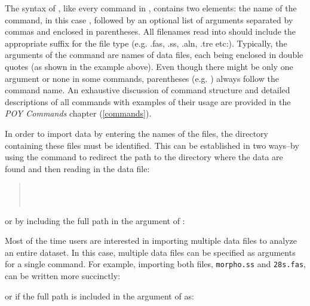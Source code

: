 {The syntax of , like every command in \poy,
contains two elements: the name of the command, in this case
, followed by an optional list of arguments
separated by commas and enclosed in parentheses. All filenames read
into \poy should include the appropriate suffix for the file type
(e.g. .fas, .ss, .aln, .tre etc:).  Typically, the arguments of the
command  are names of data files, each being
enclosed in double quotes (as shown in the example above). Even
though there might be only one argument or none in some commands,
parentheses (e.g. ) always follow the command
name. An exhaustive discussion of \poy command structure and detailed
descriptions of all commands with examples of their usage are
provided in the \emph{POY Commands} chapter (\ref{commands}).

In order to import data by entering the names of the files, the
directory containing these files must be identified.  This can be
established in two ways--by using the command 
to redirect the path to the directory where the data are found and
then reading in the data file:\\ 

\begin{quote}
\\
\\ 
\end{quote} 

or by including the
full path in the argument of :\\ 

\begin{quote}
\end{quote}

Most of the time users are interested in importing multiple data
files to analyze an entire dataset. In this case, multiple data
files can be specified as arguments for a single command. For
example, importing both files, \texttt{morpho.ss} and \texttt{28s.fas},
can be written more succinctly:\\ \begin{quote}
 \end{quote} or if the
full path is included in the argument of  as:
\\

\begin{quote}
\end{quote}

}

